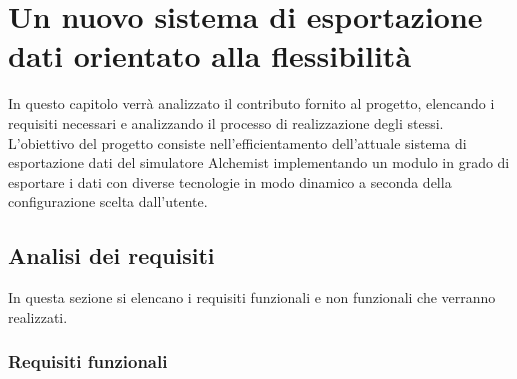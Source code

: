 \documentclass[12pt,a4paper,openright,oneside]{book}
\begin{document}
\chapter{Un nuovo sistema di esportazione dati orientato alla flessibilità}

In questo capitolo verrà analizzato il contributo fornito al progetto, elencando i requisiti necessari e analizzando il processo di realizzazione degli stessi.
L’obiettivo del progetto consiste nell'efficientamento dell'attuale sistema di esportazione dati del simulatore Alchemist implementando un modulo in grado di esportare i dati con diverse tecnologie in modo dinamico a seconda della configurazione scelta dall'utente.

\section{Analisi dei requisiti}
In questa sezione si elencano i requisiti funzionali e non funzionali che verranno realizzati. 

\subsection{Requisiti funzionali}
\end{document}

